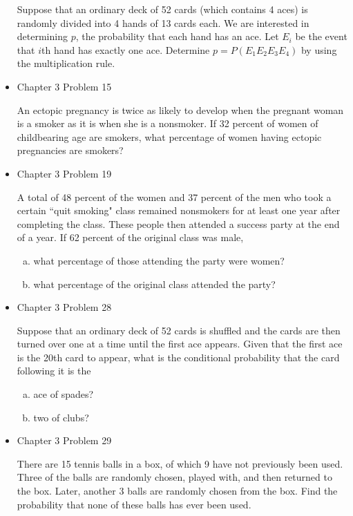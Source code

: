 \documentclass[11pt]{article}
\begin{document}
\begin{itemize}
    Suppose that an ordinary deck of 52 cards (which contains 4 aces) is randomly divided into 4 hands of 13 cards each. We are interested in determining $p$, the probability that each hand has an ace. Let $E_i$ be the event that $i$th hand has exactly one ace. Determine $p = P(E_1 E_2 E_3 E_4)$ by using the multiplication rule.

    \item
    Chapter 3 Problem  15
    
    An ectopic pregnancy is twice as likely to develop when the pregnant woman is a smoker as it is when she is a nonsmoker. If 32 percent of women of childbearing age are smokers, what percentage of women having ectopic pregnancies are smokers?

    \item
    Chapter 3 Problem  19
    
    A total of 48 percent of the women and 37 percent of the men who took a certain ``quit smoking" class remained nonsmokers for at least one year after completing the class. These people then attended a success party at the end of a year. If 62 percent of the original class was male,
    
    \begin{enumerate}[(a)]
    \item what percentage of those attending the party were women?
    
    \item what percentage of the original class attended the party?
    \end{enumerate}

    \item
    Chapter 3 Problem  28
    
    Suppose that an ordinary deck of 52 cards is shuffled and the cards are then turned over one at a time until the first ace appears. Given that the first ace is the 20th card to appear, what is the conditional probability that the card following it is the
    
    \begin{enumerate}[(a)]
    \item ace of spades?
    
    \item two of clubs?
    \end{enumerate}

    \item
    Chapter 3 Problem  29
    
    There are 15 tennis balls in a box, of which 9 have not previously been used. Three of the balls are randomly chosen, played with, and then returned to the box. Later, another 3 balls are randomly chosen from the box. Find the probability that none of these balls has ever been used.


\end{itemize}
\end{document}
